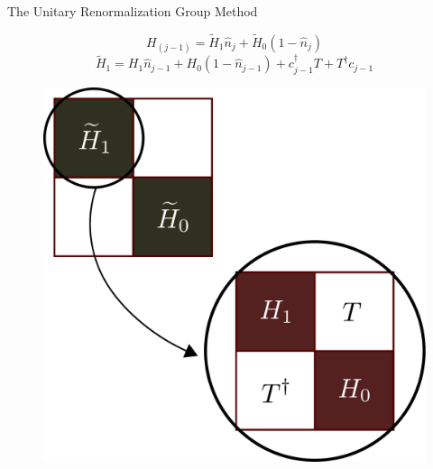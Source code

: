 \documentclass[aspectratio=169]{beamer}
\begin{document}
\begin{frame}[noframenumbering]{The Unitary Renormalization Group Method}
{\begin{minipage}{0.53\textwidth}
	\[H_{(j-1)} = \widetilde H_1 \hat n_j + \widetilde H_0 \left(1 - \hat n_j\right)\]
	\[\widetilde H_1 = H_1 \hat n_{j-1} + H_0 \left(1 - \hat n_{j-1}\right) + c^\dagger_{j-1} T + T^\dagger c_{j-1}\]
\end{minipage}
\hspace*{\fill}
\begin{minipage}{0.45\textwidth}
\begin{figure}
	\includegraphics[width=\textwidth]{figures/urg_next.pdf}
\end{figure}
\end{minipage}
}

\end{frame}
\end{document}
